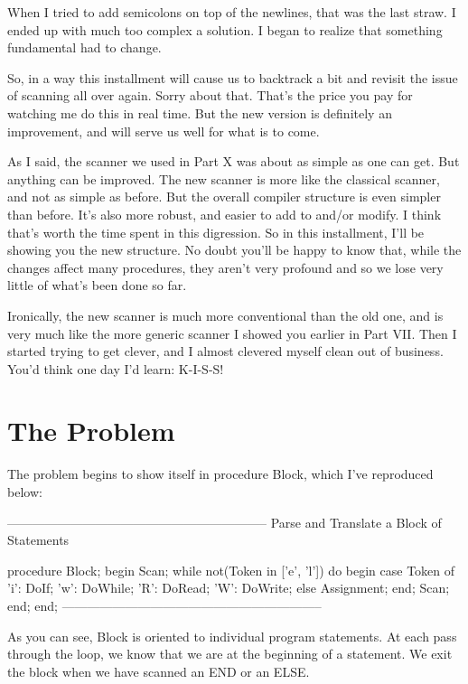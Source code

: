 \documentclass[float=false, crop=false]{standalone}
\begin{document}
When I tried to add semicolons on top of the newlines, that was the last straw.
I ended up with much too complex a solution. I began to realize that something
fundamental had to change.

So, in a way this installment will cause us to backtrack a bit and revisit the
issue of scanning all over again. Sorry about that. That's the price you pay for
watching me do this in real time. But the new version is definitely an
improvement, and will serve us well for what is to come.

As I said, the scanner we used in Part X was about as simple as one can get. But
anything can be improved. The new scanner is more like the classical scanner,
and not as simple as before. But the overall compiler structure is even simpler
than before. It's also more robust, and easier to add to and/or modify. I think
that's worth the time spent in this digression. So in this installment, I'll be
showing you the new structure. No doubt you'll be happy to know that, while the
changes affect many procedures, they aren't very profound and so we lose very
little of what's been done so far.

Ironically, the new scanner is much more conventional than the old one, and is
very much like the more generic scanner I showed you earlier in Part VII. Then I
started trying to get clever, and I almost clevered myself clean out of
business. You'd think one day I'd learn: K-I-S-S!


\section{The Problem}

The problem begins to show itself in procedure Block, which I've reproduced
below:

\begin{code}
{--------------------------------------------------------------}
{ Parse and Translate a Block of Statements }

procedure Block;
begin
   Scan;
   while not(Token in ['e', 'l']) do begin
      case Token of
       'i': DoIf;
       'w': DoWhile;
       'R': DoRead;
       'W': DoWrite;
      else Assignment;
      end;
      Scan;
   end;
end;
{--------------------------------------------------------------}
\end{code}

As you can see, Block is oriented to individual program statements. At each pass
through the loop, we know that we are at the beginning of a statement. We exit
the block when we have scanned an END or an ELSE.
\end{document}
